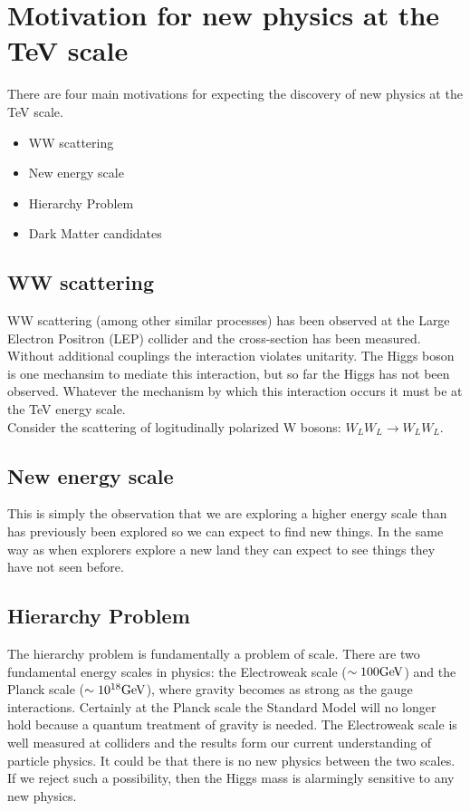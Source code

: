 \section{Motivation for new physics at the TeV scale}

There are four main motivations for expecting the discovery of new physics at 
the TeV scale.

\begin{itemize}
\item WW scattering
\item New energy scale
\item Hierarchy Problem
\item Dark Matter candidates
\end{itemize}

\subsection{WW scattering}

WW scattering (among other similar processes) has been observed at the Large 
Electron Positron (LEP) collider and the cross-section has been measured. 
Without additional couplings the interaction violates unitarity. The Higgs boson 
is one mechansim to mediate this interaction, but so far the Higgs has not been 
observed. Whatever the mechanism by which this interaction occurs it must be at 
the TeV energy scale. \\

Consider the scattering of logitudinally polarized W bosons: $W_{L}W_{L} 
\rightarrow W_{L}W_{L}$.

\subsection{New energy scale}

This is simply the observation that we are exploring a higher energy scale than
has previously been explored so we can expect to find new things. In the same
way as when explorers explore a new land they can expect to see things they
have not seen before.

\subsection{Hierarchy Problem}

The hierarchy problem is fundamentally a problem of scale. There are two
fundamental energy scales in physics: the Electroweak scale ($\sim100\mbox{GeV}$) and
the Planck scale ($\sim10^{18}\mbox{GeV}$), where gravity becomes as strong as the 
gauge interactions. Certainly at the Planck scale the Standard Model will no
longer hold because a quantum treatment of gravity is needed. The Electroweak 
scale is well measured at colliders and the results form our current 
understanding of particle physics. It could be that there is no new physics 
between the two scales. If we reject such a possibility, then the Higgs mass is
alarmingly sensitive to any new physics. \\

